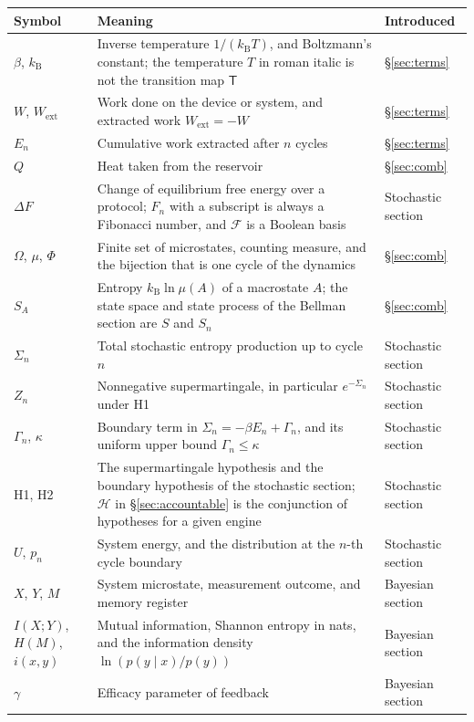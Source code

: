\documentclass[11pt]{article}
\theoremstyle{definition}
\theoremstyle{remark}
\newcommand{\kB}{k_{\mathrm B}}
\newcommand{\Tm}{\mathsf{T}}
\begin{document}
{\small
\begin{longtable}{@{}p{}p{}p{}@{}}
\hline
Symbol & Meaning & Introduced \\
\hline
\endhead
\hline
\endfoot
$\beta$, $\kB$ & Inverse temperature $1/(\kB T)$, and Boltzmann's constant; the temperature $T$ in roman italic is not the transition map $\Tm$ & \S\ref{sec:terms} \\
$W$, $W_{\mathrm{ext}}$ & Work done on the device or system, and extracted work $W_{\mathrm{ext}} = -W$ & \S\ref{sec:terms} \\
$E_n$ & Cumulative work extracted after $n$ cycles & \S\ref{sec:terms} \\
$Q$ & Heat taken from the reservoir & \S\ref{sec:comb} \\
$\Delta F$ & Change of equilibrium free energy over a protocol; $F_n$ with a subscript is always a Fibonacci number, and $\mathcal{F}$ is a Boolean basis & Stochastic section \\
$\Omega$, $\mu$, $\Phi$ & Finite set of microstates, counting measure, and the bijection that is one cycle of the dynamics & \S\ref{sec:comb} \\
$S_A$ & Entropy $\kB \ln \mu(A)$ of a macrostate $A$; the state space and state process of the Bellman section are $S$ and $S_n$ & \S\ref{sec:comb} \\
$\Sigma_n$ & Total stochastic entropy production up to cycle $n$ & Stochastic section \\
$Z_n$ & Nonnegative supermartingale, in particular $e^{-\Sigma_n}$ under H1 & Stochastic section \\
$\Gamma_n$, $\kappa$ & Boundary term in $\Sigma_n = -\beta E_n + \Gamma_n$, and its uniform upper bound $\Gamma_n \le \kappa$ & Stochastic section \\
H1, H2 & The supermartingale hypothesis and the boundary hypothesis of the stochastic section; $\mathcal{H}$ in \S\ref{sec:accountable} is the conjunction of hypotheses for a given engine & Stochastic section \\
$U$, $p_n$ & System energy, and the distribution at the $n$-th cycle boundary & Stochastic section \\
$X$, $Y$, $M$ & System microstate, measurement outcome, and memory register & Bayesian section \\
$I(X;Y)$, $H(M)$, $i(x,y)$ & Mutual information, Shannon entropy in nats, and the information density $\ln(p(y \mid x)/p(y))$ & Bayesian section \\
$\gamma$ & Efficacy parameter of feedback & Bayesian section \\

\end{longtable}}
\end{document}
